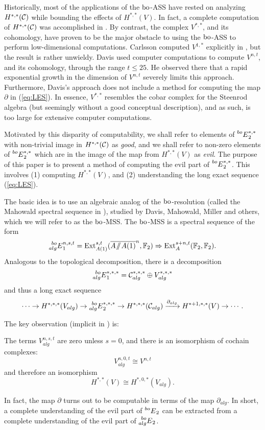 Historically, most of the applications of the $\mathrm{bo}$-ASS have rested on analyzing $H^{*,*}(\mathcal{C})$ while bounding the effects of $H^{*,*}(V)$.  In fact, 
a complete computation of $H^{*,*}(\mathcal{C})$ was accomplished in \cite{LM}.  By contrast, the complex $V^{*,*}$, and its cohomology, have proven to be the major obstacle to using the $\mathrm{bo}$-ASS to perform low-dimensional computations.  Carlsson computed $V^{1,*}$ explicitly in \cite{Carlsson}, but the result is rather unwieldy.  Davis \cite{Davisbo} used computer computations to compute $V^{n,t}$, and its cohomology, through the range $t \le 25$.  He observed there that a rapid exponential growth in the dimension of $V^{n,t}$ severely limits this approach.  Furthermore, Davis's approach does not include a method for computing the map $\partial$ in (\ref{eq:LES}).  In essence, $V^{*,*}$ resembles the cobar complex for the Steenrod algebra (but seemingly without a good conceptual description), and as such, is too large for extensive computer computations.

Motivated by this disparity of computability, we shall refer to elements of $\prescript{bo}{}{E}_2^{*,*}$ with non-trivial image in $H^{*,*}(\mathcal{C})$ as \emph{good}, and we shall refer to non-zero elements of $\prescript{bo}{}{E}_2^{*,*}$ which are in the image of the map from $H^{*,*}(V)$ as \emph{evil}.  The purpose of this paper is to present a method of computing the evil part of $\prescript{bo}{}{E}_2^{*,*}$.  This involves (1) computing $H^{*,*}(V)$, and (2) understanding the long exact sequence (\ref{eq:LES}).

The basic idea is to use an algebraic analog of the $\mathrm{bo}$-resolution (called the Mahowald spectral sequence in \cite{Miller}), studied by Davis, Mahowald, Miller and others, which we will refer to as the $\mathrm{bo}$-MSS.  The $\mathrm{bo}$-MSS is a spectral sequence of the form
$$ \prescript{bo}{alg}{E}_1^{n,s,t} = \operatorname{Ext}^{s,t}_{A(1)}(\overline{A\! \sslash \! A(1)}^{n}, \mathbb{F}_2) \Rightarrow \operatorname{Ext}^{s+n,t}_{A}(\mathbb{F}_2, \mathbb{F}_2). $$
Analogous to the topological decomposition, there is a decomposition
$$ \prescript{bo}{alg}{E}_1^{*,*,*} = \mathcal{C}^{*,*,*}_{alg} \oplus V^{*,*,*}_{alg} $$
and thus a long exact sequence
\begin{equation}\label{eq:algLES}
\cdots \rightarrow H^{*,*,*}(V_{alg}) \rightarrow \prescript{bo}{alg}{E}_2^{*,*,*} \rightarrow H^{*,*,*}(\mathcal{C}_{alg}) \xrightarrow{\partial_{alg}} H^{*+1, *,*}(V) \rightarrow \cdots.
\end{equation}

The key observation (implicit in \cite{Davisbo}) is:
\begin{obs}
The terms $V_{alg}^{n,s,t}$ are zero unless $s = 0$, and there is an isomorphism of cochain complexes:
$$ V_{alg}^{n,0,t} \cong V^{n,t} $$
and therefore an isomorphism
$$ H^{*,*}(V) \cong H^{*,0,*}(V_{alg}). $$
\end{obs}
 In fact, the map $\partial$ turns out to be computable in terms of the map $\partial_{alg}$.  In short, a complete understanding of the evil part of $\prescript{bo}{}{E}_2$ can be extracted from a complete understanding of the evil part of $\prescript{bo}{alg}{E}_2$.  

